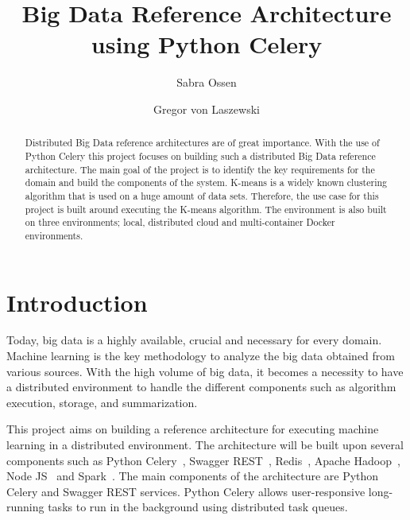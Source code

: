 
\title{Big Data Reference Architecture using Python Celery}


\author{Sabra Ossen}

\author{Gregor von Laszewski}


\renewcommand{\shortauthors}{G. v. Laszewski}


\begin{abstract}
Distributed Big Data reference architectures are of great importance. 
With the use of Python Celery this project focuses on building such a 
distributed Big Data reference architecture. The main goal of the project is 
to identify the key requirements for the domain and build the components of 
the system. K-means is a widely known clustering algorithm that is used 
on a huge amount of data sets. Therefore, the use case for this project 
is built around executing the K-means algorithm. The environment is also 
built on three environments; local, distributed cloud and multi-container 
Docker environments.
\end{abstract}



\maketitle

\section{Introduction}

Today, big data is a highly available, crucial and necessary for every domain. 
Machine learning is the key methodology to analyze the big data obtained from 
various sources. With the high volume of big data, it becomes a necessity to 
have a distributed environment to handle the different components such as 
algorithm execution, storage, and summarization. 

This project aims on building a reference architecture for executing 
machine learning in a distributed environment. The architecture will be built 
upon several components such as Python 
Celery~\cite{hid-sp18-416-www-python-celery}, Swagger 
REST~\cite{hid-sp18-416-www-swagger}, Redis~\cite{hid-sp18-416-www-redis}, 
Apache Hadoop~\cite{hid-sp18-416-www-apache-hadoop}, 
Node JS~\cite{hid-sp18-416-www-nodejs} and 
Spark~\cite{hid-sp18-416-www-apache-spark}. The main components of the 
architecture are Python Celery and Swagger REST services. Python Celery allows 
user-responsive long-running tasks to run in the background using distributed 
task queues. 


